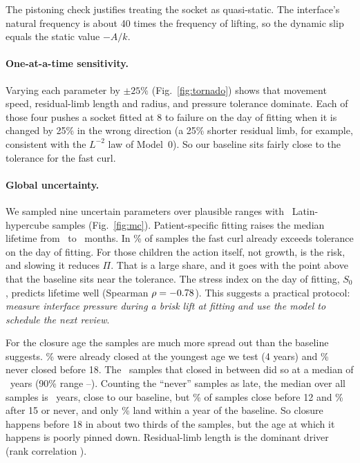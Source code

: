 \documentclass[11pt]{article}
\begin{document}
The pistoning check justifies treating the socket as quasi-static. The interface's natural frequency is about 40 times the frequency of lifting, so the dynamic slip equals the static value $-A/k$.

\paragraph{One-at-a-time sensitivity.} Varying each parameter by $\pm25\%$ (Fig.~\ref{fig:tornado}) shows that movement speed, residual-limb length and radius, and pressure tolerance dominate. Each of those four pushes a socket fitted at 8 to failure on the day of fitting when it is changed by 25\% in the wrong direction (a 25\% shorter residual limb, for example, consistent with the $L^{-2}$ law of Model~0). So our baseline sits fairly close to the tolerance for the fast curl.

\paragraph{Global uncertainty.} We sampled nine uncertain parameters over plausible ranges with \mcN\ Latin-hypercube samples \citep{mckay1979} (Fig.~\ref{fig:mc}). Patient-specific fitting raises the median lifetime from \mcStdMed\ to \mcIndMed\ months. In \mcDayOne\% of samples the fast curl already exceeds tolerance on the day of fitting. For those children the action itself, not growth, is the risk, and slowing it reduces $\Pi$. That is a large share, and it goes with the point above that the baseline sits near the tolerance. The stress index on the day of fitting, $S_0$, predicts lifetime well (Spearman $\rho=-0.78$). This suggests a practical protocol: \emph{measure interface pressure during a brisk lift at fitting and use the model to schedule the next review}.

For the closure age the samples are much more spread out than the baseline suggests. \mcCloPinned\% were already closed at the youngest age we test (4 years) and \mcNever\% never closed before 18. The \mcCloBetweenN\ samples that closed in between did so at a median of \mcCloBetweenMed\ years (90\% range \mcCloBetweenLo--\mcCloBetweenHi). Counting the ``never'' samples as late, the median over all samples is \mcCloOverall\ years, close to our baseline, but \mcCloBeforeTwelve\% of samples close before 12 and \mcCloLate\% after 15 or never, and only \mcCloNear\% land within a year of the baseline. So closure happens before 18 in about two thirds of the samples, but the age at which it happens is poorly pinned down. Residual-limb length is the dominant driver (rank correlation \mcCloRho).
\end{document}
